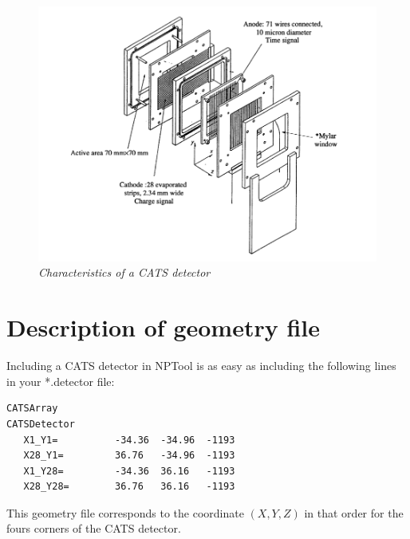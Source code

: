 \documentclass[a4paper,12pt]{article}
\begin{document}
\begin{figure}[h!]
\begin{center}
\includegraphics[scale=0.35]{CATS_det.png}
\caption{\textit{Characteristics of a CATS detector}}
\label{fig:CATS}
\end{center}
\end{figure}

\section{Description of geometry file}
Including a CATS detector in NPTool is as easy as including the following
lines in your *.detector file:
\begin{verbatim}
CATSArray
CATSDetector
   X1_Y1=          -34.36  -34.96  -1193
   X28_Y1=         36.76   -34.96  -1193
   X1_Y28=         -34.36  36.16   -1193
   X28_Y28=        36.76   36.16   -1193
\end{verbatim}
This geometry file corresponds to the coordinate $(X,Y,Z)$ in that order for the fours corners of the CATS detector.
\end{document}
